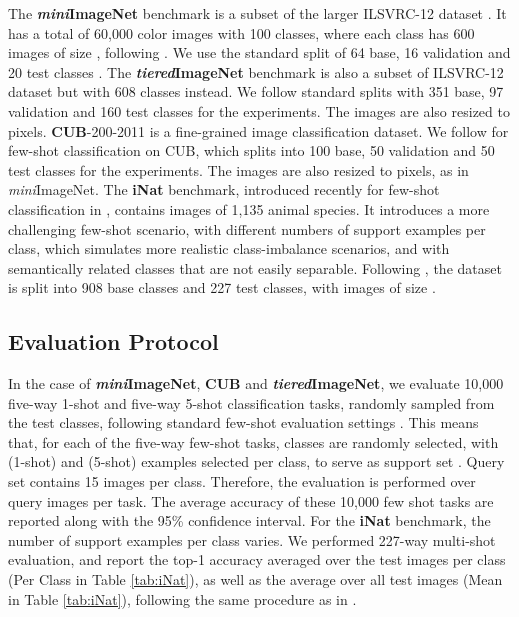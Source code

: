 \documentclass{article}
\begin{document}
The \textbf{\textit{mini}ImageNet} benchmark is a subset of the larger ILSVRC-12 dataset \cite{ILSVRC15}. It has a total of 60,000 color images with 100 classes, where each class has 600 images of size , following \cite{Vinyals2016MatchingNF}. We use the standard split of 64 base, 16 validation and 20 test classes \cite{Ravi2017OptimizationAA,wang2019simpleshot}. The \textbf{\textit{tiered}ImageNet} benchmark \cite{ren18fewshotssl} is also a subset of ILSVRC-12 dataset but with 608 classes instead. We follow standard splits with 351 base, 97 validation and 160 test classes for the experiments. The images are also resized to  pixels. \textbf{CUB}-200-2011 \cite{wah2011caltech} is a fine-grained image classification dataset. We follow \cite{chen2018a} for few-shot classification on CUB, which splits into 100 base, 50 validation and 50 test classes for the experiments. The images are also resized to  pixels, as in \textit{mini}ImageNet. The \textbf{iNat} benchmark, introduced recently for few-shot classification in \cite{wertheimer2019few}, contains images of 1,135 animal species. It introduces a more challenging few-shot scenario, with different numbers of support examples per class, which simulates more realistic class-imbalance scenarios, and with semantically related classes that are not easily separable. Following \cite{wertheimer2019few}, the dataset is split into 908 base classes and 227 test classes, with images of size .

\subsection{Evaluation Protocol}
In the case of \textbf{\textit{mini}ImageNet}, \textbf{CUB} and \textbf{\textit{tiered}ImageNet}, we evaluate 10,000 five-way 1-shot and five-way 5-shot classification tasks, randomly sampled from the test classes, following standard few-shot evaluation settings \cite{wang2019simpleshot,rusu2018metalearning}. This means that, for each of the five-way few-shot tasks,  classes are randomly selected, with  (1-shot) and  (5-shot) examples selected per class, to serve as support set .
Query set  contains 15 images per class. Therefore, the evaluation is performed over  query images per task. The average accuracy of these 10,000 few shot tasks are reported along with the 95\% confidence interval. For the \textbf{iNat} benchmark, the number of support examples  per class varies. We performed 227-way multi-shot evaluation, and report the top-1 accuracy averaged over the test images per class (Per Class in Table \ref{tab:iNat}), as well as the average over all test images (Mean in Table \ref{tab:iNat}), following the same procedure as in \cite{wertheimer2019few,wang2019simpleshot}. 
\end{document}
